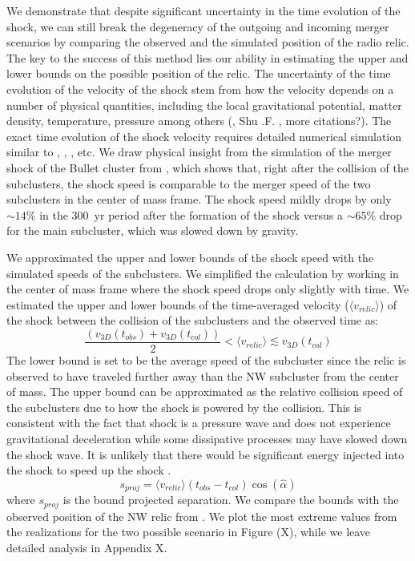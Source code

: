 We demonstrate that despite significant uncertainty in the time
evolution of the shock, we can still break the degeneracy of the
outgoing and incoming merger scenarios by comparing the observed and the
simulated position of the radio relic.
The key to the success of this method lies our ability in estimating the
upper and lower bounds on the possible position of the relic. The
uncertainty of the time evolution of the velocity of the shock stem from
how the velocity depends on a number of physical quantities, including the
local gravitational potential, matter density, temperature, pressure among others (\citealt{E98}, Shu .F. , more
citations?).  The exact time evolution of the shock velocity requires
detailed numerical simulation similar to  \citet{Springel2007},
\citet{Vazza11}, \citet{Kang2007}, etc. 
We draw physical insight from the
simulation of the merger shock of the Bullet cluster from
\citet{Springel2007}, which shows
that, right after the collision of the subclusters, the shock speed is
comparable to the merger speed of the two subclusters in the center of mass frame.  The shock speed mildly drops by only $\sim 14\%$
in the 300~\mega yr period after the formation of the shock versus  
a $\sim65\%$ drop for the main subcluster, which was slowed down by gravity. 

We approximated the upper and lower bounds of the shock speed with the
simulated speeds of the subclusters.  We simplified the calculation by
working in the center of mass frame where the shock speed drops only
slightly with time. We estimated the upper and lower bounds of the
time-averaged velocity ($\langle v_{relic} \rangle$) of the shock between
the collision of the subclusters and the observed time as:  
\begin{equation}
	\frac{(v_{3D}(t_{obs}) + v_{3D}(t_{col}))}{2}	< \langle v_{relic} \rangle \lesssim v_{3D}(t_{col}) 
\end{equation}
The lower bound is set to be the average speed of the subcluster since the
relic is observed to have traveled further away than the NW subcluster from
the center of mass. The upper bound can be approximated as the relative
collision speed of the subclusters due to how the shock is powered by the
collision. This is
consistent with the fact that shock is a pressure wave
and does not experience gravitational deceleration while some dissipative
processes may have slowed down the shock wave. It is unlikely that there
would be significant energy injected into the shock to speed up the shock .
\begin{equation}
	s_{proj} = \langle v_{relic} \rangle (t_{obs} - t_{col}) \cos(\hat{\alpha})
\end{equation}
where $s_{proj}$ is the bound projected separation. 
We compare the bounds with the observed position of the NW relic from
\citet{L13}. We plot the most extreme values from the realizations for the
two possible scenario in Figure (X), while we leave detailed analysis in
Appendix X.

